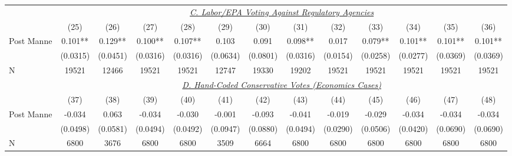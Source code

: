 \begin{center}
{\begin{tabular}{l*{12}{c}}
                    &\multicolumn{12}{c}{\uline{\textit{C. Labor/EPA Voting Against Regulatory Agencies}}}                                                                                              \\
                    &        (25)  &        (26)  &        (27)  &        (28)  &        (29)  &        (30)  &        (31)  &        (32)  &        (33)  &        (34)  &        (35)  &        (36)  \\
\cmidrule(lr){2-13}
Post Manne          &       0.101**&       0.129**&       0.100**&       0.107**&       0.103  &       0.091  &       0.098**&       0.017  &       0.079**&       0.101**&       0.101**&       0.101**\\
                    &    (0.0315)  &    (0.0451)  &    (0.0316)  &    (0.0316)  &    (0.0634)  &    (0.0801)  &    (0.0316)  &    (0.0154)  &    (0.0258)  &    (0.0277)  &    (0.0369)  &    (0.0369)  \\
\cmidrule(lr){1-13}
N                   &       19521  &       12466  &       19521  &       19521  &       12747  &       19330  &       19202  &       19521  &       19521  &       19521  &       19521  &       19521  \\


                    &\multicolumn{12}{c}{\uline{\textit{D. Hand-Coded Conservative Votes (Economics Cases)}}}                                                                                           \\
                    &        (37)  &        (38)  &        (39)  &        (40)  &        (41)  &        (42)  &        (43)  &        (44)  &        (45)  &        (46)  &        (47)  &        (48)  \\
\cmidrule(lr){2-13}
Post Manne          &      -0.034  &       0.063  &      -0.034  &      -0.030  &      -0.001  &      -0.093  &      -0.041  &      -0.019  &      -0.029  &      -0.034  &      -0.034  &      -0.034  \\
                    &    (0.0498)  &    (0.0581)  &    (0.0494)  &    (0.0492)  &    (0.0947)  &    (0.0880)  &    (0.0494)  &    (0.0290)  &    (0.0506)  &    (0.0420)  &    (0.0690)  &    (0.0690)  \\
\cmidrule(lr){1-13}
N                   &        6800  &        3676  &        6800  &        6800  &        3509  &        6664  &        6800  &        6800  &        6800  &        6800  &        6800  &        6800  \\



\end{tabular}}
\end{center}
